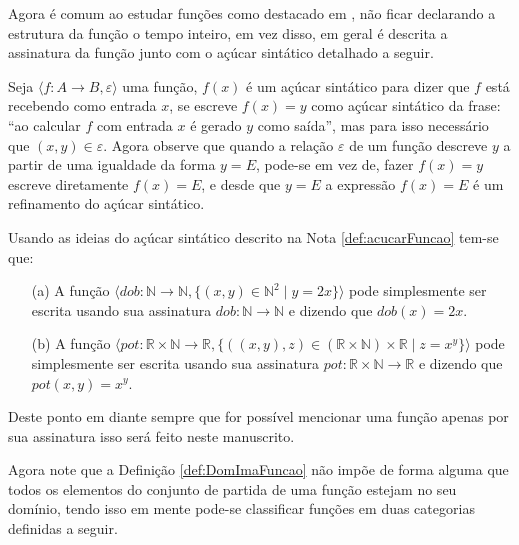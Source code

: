 Agora é comum ao estudar funções como destacado em \cite{carmo2013}, não ficar declarando a estrutura da função o tempo inteiro, em vez disso, em geral é descrita a assinatura da função junto com o açúcar sintático detalhado a seguir.

\begin{note}\label{def:acucarFuncao}
	Seja  $\langle f: A \rightarrow B, \varepsilon \rangle$ uma função, $f(x)$ é um açúcar sintático para dizer que $f$ está recebendo como entrada $x$, se escreve $f(x) = y$ como açúcar sintático da frase: ``ao calcular $f$ com entrada $x$ é gerado $y$ como saída'', mas para isso necessário que $(x, y) \in \varepsilon$. Agora observe que quando a relação $\varepsilon$ de um função descreve $y$ a partir de uma igualdade da forma $y = E$, pode-se em vez de, fazer $f(x) = y$ escreve diretamente $f(x) = E$, e desde que $y = E$ a expressão $f(x) = E$ é um refinamento do açúcar sintático.
\end{note}

\begin{example}
	Usando as ideias do açúcar sintático descrito na Nota \ref{def:acucarFuncao} tem-se que:
	\begin{itemize}
		\item[(a)] A função  $\langle dob: \mathbb{N} \rightarrow  \mathbb{N},  \{(x, y) \in \mathbb{N}^2 \mid  y = 2x\} \rangle$ pode simplesmente ser escrita usando sua assinatura $dob:\mathbb{N} \rightarrow  \mathbb{N}$ e dizendo que $dob(x) = 2x$.
		\item[(b)] A função  $\langle pot: \mathbb{R} \times \mathbb{N} \rightarrow  \mathbb{R},  \{((x, y), z) \in (\mathbb{R} \times \mathbb{N}) \times \mathbb{R} \mid  z = x^y\} \rangle$ pode simplesmente ser escrita usando sua assinatura $pot: \mathbb{R} \times \mathbb{N} \rightarrow  \mathbb{R}$ e dizendo que $pot(x, y) = x^y$.
	\end{itemize}
\end{example}

\begin{remark}
	Deste ponto em diante sempre que for possível mencionar uma função apenas por sua assinatura isso será feito neste manuscrito.
\end{remark}

Agora note que a Definição \ref{def:DomImaFuncao} não impõe de forma alguma que todos os elementos do conjunto de partida de uma função estejam no seu domínio, tendo isso em mente pode-se classificar funções em duas categorias definidas a seguir.

